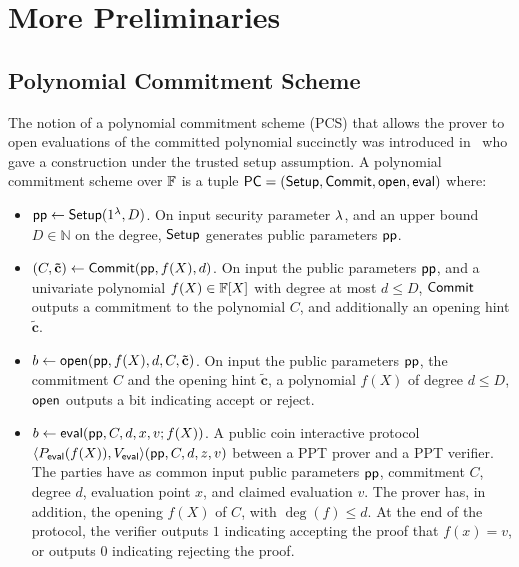 \section{More Preliminaries}

\subsection{Polynomial Commitment Scheme}
\label{sec:pcs_def}
The notion of a polynomial commitment scheme (PCS) that allows the prover to open evaluations of the committed polynomial succinctly was introduced in~\cite{AC:KatZavGol10} who gave a construction under the trusted setup assumption.
A polynomial commitment scheme over $\mathbb{F}$ is a tuple $\mathsf{PC} = 
(\mathsf{Setup},\mathsf{Commit},\mathsf{open},\mathsf{eval})$ where:

\begin{itemize}
    \item $\mathsf{pp} \leftarrow \mathsf{Setup}(1^{\lambda},D) $. On input security parameter $\lambda$, and an upper bound $D \in \mathbb{N}$ on the degree, $\mathsf{Setup}$ generates public parameters $\mathsf{pp}$.
    
    \item $(C,\mathbf{\tilde{c}}) \leftarrow \mathsf{Commit}(\mathsf{pp}, f(X),d) $. On input the public parameters $\mathsf{pp}$, and a univariate polynomial $f(X) \in \mathbb{F}[X]$ with degree at most $d \leq D$, $\mathsf{Commit}$ outputs a commitment to the polynomial $C$, and additionally an opening hint $\mathbf{\tilde{c}}$.
	
	\item $b \leftarrow \mathsf{open}(\mathsf{pp},f(X),d,C,\mathbf{\tilde{c}})$. On input the public parameters $\mathsf{pp}$, the commitment $C$ and the opening hint $\mathbf{\tilde{c}}$, a polynomial $f(X)$ of degree $d \leq D$, $\mathsf{open}$ outputs a bit indicating accept or reject. 
    
	    \item $b \leftarrow \mathsf{eval}(\mathsf{pp},C,d,x,v;f(X)) $. A public coin interactive protocol 
	    $\langle P_{\mathsf{eval}}(f(X)), V_{\mathsf{eval}} \rangle(\mathsf{pp},C,d,z,v)$ between a PPT prover and a PPT verifier. The parties have as common input public parameters $\mathsf{pp}$, commitment $C$, degree $d$, evaluation point $x$, and claimed evaluation $v$. The prover has, in addition, the opening $f(X)$ of $C$, with $\deg(f) \leq d$. At the end of the protocol, the verifier outputs $1$ indicating accepting the proof that $f(x)=v$, or outputs $0$ indicating rejecting the proof.
		
		\end{itemize}
		
